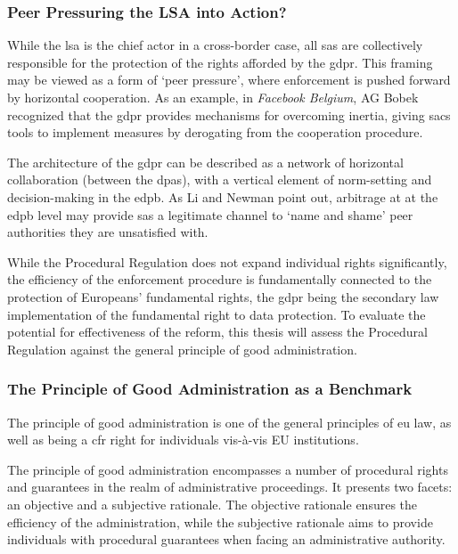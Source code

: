 \subsubsection{Peer Pressuring the LSA into Action?}
\label{sec:ch1-peer-pressure}

While the \gls{lsa} is the chief actor in a cross-border case, all \glspl{sa} are collectively responsible for the protection of the rights afforded by the \gls{gdpr}.\autocite[paras 63--68]{facebookBelgium}
This framing may be viewed as a form of `peer pressure', where enforcement is pushed forward by horizontal cooperation.\autocite[466]{hofmannmustertScholtenHandbook2023} 
As an example, in \emph{Facebook Belgium}, AG Bobek recognized that the \gls{gdpr} provides mechanisms for overcoming inertia, giving \glspl{sac} tools to implement measures by derogating from the cooperation procedure.\autocite[114--121]{fbBelgiumAgBobek}

The architecture of the \gls{gdpr} can be described as a network of horizontal collaboration (between the \glspl{dpa}), with a vertical element of norm-setting and decision-making in the \gls{edpb}.\autocite[428]{mastenbroekFillingGapEuropean2018}
As Li and Newman point out, arbitrage at at the \gls{edpb} level may provide \glspl{sa} a legitimate channel to `name and shame' peer authorities they are unsatisfied with.\autocite[1703]{liShoulderEnforcementEuropean2022}

While the Procedural Regulation does not expand individual rights significantly, the efficiency of the enforcement procedure is fundamentally connected to the protection of Europeans' fundamental rights, the \gls{gdpr} being the secondary law implementation of the fundamental right to data protection.\autocite[16]{TFEU}
To evaluate the potential for effectiveness of the reform, this thesis will assess the Procedural Regulation against the general principle of good administration.

\subsubsection{The Principle of Good Administration as a Benchmark}
\label{sec:ch1-benchmark}

The principle of good administration is one of the general principles of \gls{eu} law,\autocite[49]{HNvMinisterJustice} as well as being a \gls{cfr} right for individuals vis-à-vis EU institutions.\autocite[41]{CFR}

The principle of good administration encompasses a number of procedural rights and guarantees in the realm of administrative proceedings.
It presents two facets: an objective and a subjective rationale.\autocite[111--112]{mihaescu-evansRightGoodAdministration2015}
The objective rationale ensures the efficiency of the administration, while the subjective rationale aims to provide individuals with procedural guarantees when facing an administrative authority.\autocite[111--112]{mihaescu-evansRightGoodAdministration2015}

